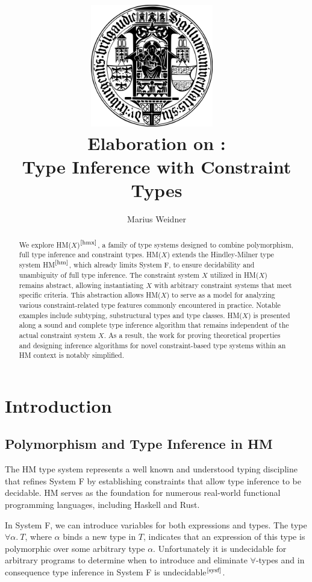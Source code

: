 \documentclass[runningheads]{llncs}
\title{\includegraphics[width=0.4\textwidth]{logo.png}~\\[1cm] Elaboration on
  \hmx:\\Type Inference with Constraint Types}
\institute{Chair of Programming Languages, University of Freiburg \\
  \email{weidner@cs.uni-freiburg.de}}
\author{Marius Weidner}
\newcommand{\hmx}{HM($X$)}
\begin{document}
\let\oldaddcontentsline\addcontentsline{}
\def\addcontentsline#1#2#3{}
\maketitle
\def\addcontentsline#1#2#3{\oldaddcontentsline{#1}{#2}{#3}}

\begin{abstract}
  We explore \hmx{}$^\text{\cite{hmx}}$, a family of type systems designed to
  combine
  polymorphism, full type inference and constraint types.
  \hmx{} extends the Hindley-Milner type system HM$^\text{\cite{hm}}$, which
  already
  limits
  System F, to ensure decidability and unambiguity of full type inference.
  The constraint system $X$ utilized in \hmx{} remains abstract, allowing
  instantiating $X$ with arbitrary constraint systems that meet specific
  criteria.
  This abstraction allows \hmx{} to serve as a model for analyzing various
  constraint-related type features commonly encountered in practice.
  Notable examples include subtyping, substructural
  types and type classes.
  \hmx{} is presented along a sound and complete type inference algorithm that
  remains
  independent of the actual constraint system
  $X$.
  As a result, the work for proving theoretical properties and designing
  inference algorithms for novel constraint-based type systems within an
  HM context is notably simplified.
\end{abstract}

\setcounter{tocdepth}{2}
\tableofcontents
\newpage

\section{Introduction}

\subsection{Polymorphism and Type Inference in HM}
The HM type system represents a well known and understood typing discipline
that
refines System F by establishing constraints that allow type inference
to be decidable.
HM serves as the foundation for numerous real-world functional programming
languages, including Haskell and Rust.

In System F, we can introduce variables for both expressions and types.
The type $∀α. \ T$, where $α$ binds a new type in $T$,
indicates that an expression of this type is polymorphic over some
arbitrary type $α$.
Unfortunately it is undecidable for arbitrary programs to determine when to
introduce and eliminate $∀$-types and in consequence type inference in System F
is undecidable$^\text{\cite{sysf}}$.
\end{document}
